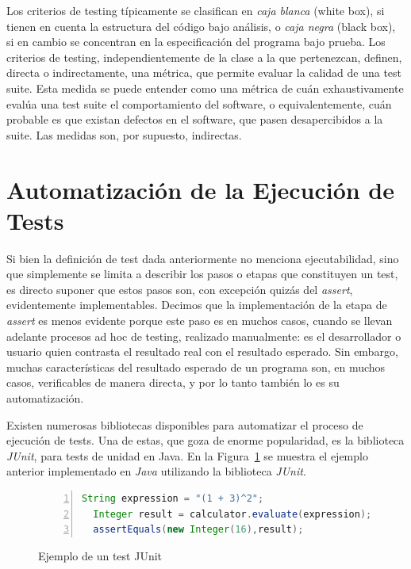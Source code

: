 Los criterios de testing t\'ipicamente se clasifican en \emph{caja blanca} (white box), si tienen en cuenta la estructura del c\'odigo bajo an\'alisis, o \emph{caja negra} (black box), si en cambio se concentran en la especificaci\'on del programa bajo prueba. Los criterios de testing, independientemente de la clase a la que pertenezcan, definen, directa o indirectamente, una m\'etrica, que permite evaluar la calidad de una test suite. Esta medida se puede entender como una m\'etrica de cu\'an exhaustivamente eval\'ua una test suite el comportamiento del software, o equivalentemente, cu\'an probable es que existan defectos en el software, que pasen desapercibidos a la suite. Las medidas son, por supuesto, indirectas. 

\section{Automatizaci\'on de la Ejecuci\'on de Tests}
\label{sec:preliminares.testing.automation}

Si bien la definici\'on de test dada anteriormente no menciona ejecutabilidad, sino que simplemente se limita a describir los pasos o etapas que constituyen un test, es directo suponer que estos pasos son, con excepci\'on quiz\'as del \emph{assert}, evidentemente implementables. Decimos que la implementaci\'on de la etapa de \emph{assert} es menos evidente porque este paso es en muchos casos, cuando se llevan adelante procesos ad hoc de testing, realizado manualmente: es el desarrollador o usuario quien contrasta el resultado real con el resultado esperado. Sin embargo, muchas caracter\'isticas del resultado esperado de un programa son, en muchos casos, verificables de manera directa, y por lo tanto tambi\'en lo es su automatizaci\'on. 

Existen numerosas bibliotecas disponibles para automatizar el proceso de ejecuci\'on de tests. Una de estas, que goza de enorme popularidad, es la biblioteca \emph{JUnit}, para tests de unidad en Java. En la Figura~\ref{figures.examples.test.junit} se muestra el ejemplo anterior implementado en \emph{Java} utilizando la biblioteca \emph{JUnit}.

\begin{figure}[ht!]
	\begin{lstlisting}[frame=single, mathescape=true,numbers=left,framexleftmargin=1.5em,language=Java,basicstyle={},xleftmargin=.055\textwidth,xrightmargin=.01\textwidth]
  String expression = "(1 + 3)^2";
  Integer result = calculator.evaluate(expression);
  assertEquals(new Integer(16),result);
	\end{lstlisting}
	\caption{Ejemplo de un test JUnit}
	\label{figures.examples.test.junit}
\end{figure}

